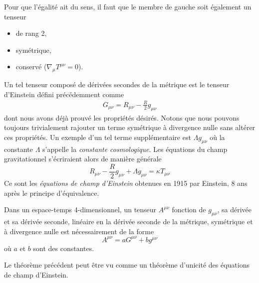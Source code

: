 Pour que l'égalité ait du sens, il faut que le membre de gauche soit également un tenseur
\begin{itemize}
    \item de rang 2,
    \item symétrique,
    \item conservé ($\nabla_\mu T^{\mu\nu} = 0$).
\end{itemize}
Un tel tenseur composé de dérivées secondes de la métrique est le tenseur d'Einstein défini précédemment comme
\begin{align}
    G_{\mu \nu} = R_{\mu \nu} - \frac{R}{2}g_{\mu \nu}
\end{align}
dont nous avons déjà prouvé les propriétés désirés. Notons que nous pouvons toujours trivialement rajouter un terme symétrique à divergence nulle sans altérer ces propriétés. Un exemple d'un tel terme supplémentaire est $\Lambda g_{\mu\nu}$ où la constante $\Lambda$ s'appelle la \emph{constante cosmologique}. Les équations du champ gravitationnel s'écriraient alors de manière générale
\begin{equation}
    \label{eq: einstein FE}
    \boxed{R_{\mu\nu} - \frac{R}{2} g_{\mu\nu} + \Lambda g_{\mu\nu} = \kappa T_{\mu\nu}}
\end{equation}
Ce sont les \emph{équations de champ d'Einstein} obtenues en 1915 par Einstein, 8 ans après le principe d'équivalence.
\begin{theoremframe}
    \begin{theorem}[de Lovelock]
        Dans un espace-temps 4-dimensionnel, un tenseur $A^{\mu\nu}$ fonction de $g_{\mu \nu}$, sa dérivée et sa dérivée seconde, linéaire en la dérivée seconde de la métrique, symétrique et à divergence nulle est nécessairement de la forme
        \begin{equation}
            A^{\mu\nu} = a G^{\mu\nu} + b g^{\mu\nu}
        \end{equation}
        où $a$ et $b$ sont des constantes.
    \end{theorem}
\end{theoremframe}
\begin{rmk}
    Le théorème précédent peut être vu comme un théorème d'unicité des équations de champ d'Einstein. 
\end{rmk}
